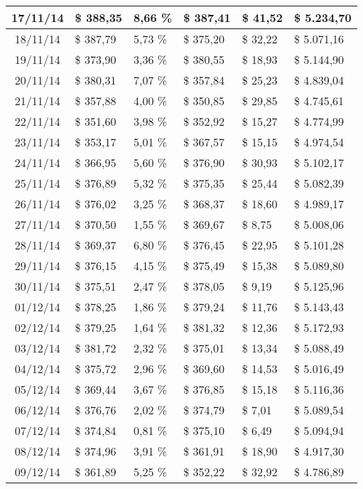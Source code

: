 \begin{small}
\begin{longtable}{|c|l|l|l|l|l|}
17/11/14 & \$ 388,35 & 8,66 \% & \$ 387,41 & \$ 41,52 & \$ 5.234,70 \\ \hline
18/11/14 & \$ 387,79 & 5,73 \% & \$ 375,20 & \$ 32,22 & \$ 5.071,16 \\ \hline
19/11/14 & \$ 373,90 & 3,36 \% & \$ 380,55 & \$ 18,93 & \$ 5.144,90 \\ \hline
20/11/14 & \$ 380,31 & 7,07 \% & \$ 357,84 & \$ 25,23 & \$ 4.839,04 \\ \hline
21/11/14 & \$ 357,88 & 4,00 \% & \$ 350,85 & \$ 29,85 & \$ 4.745,61 \\ \hline
22/11/14 & \$ 351,60 & 3,98 \% & \$ 352,92 & \$ 15,27 & \$ 4.774,99 \\ \hline
23/11/14 & \$ 353,17 & 5,01 \% & \$ 367,57 & \$ 15,15 & \$ 4.974,54 \\ \hline
24/11/14 & \$ 366,95 & 5,60 \% & \$ 376,90 & \$ 30,93 & \$ 5.102,17 \\ \hline
25/11/14 & \$ 376,89 & 5,32 \% & \$ 375,35 & \$ 25,44 & \$ 5.082,39 \\ \hline
26/11/14 & \$ 376,02 & 3,25 \% & \$ 368,37 & \$ 18,60 & \$ 4.989,17 \\ \hline
27/11/14 & \$ 370,50 & 1,55 \% & \$ 369,67 & \$ 8,75 & \$ 5.008,06 \\ \hline
28/11/14 & \$ 369,37 & 6,80 \% & \$ 376,45 & \$ 22,95 & \$ 5.101,28 \\ \hline
29/11/14 & \$ 376,15 & 4,15 \% & \$ 375,49 & \$ 15,38 & \$ 5.089,80 \\ \hline
30/11/14 & \$ 375,51 & 2,47 \% & \$ 378,05 & \$ 9,19 & \$ 5.125,96 \\ \hline
01/12/14 & \$ 378,25 & 1,86 \% & \$ 379,24 & \$ 11,76 & \$ 5.143,43 \\ \hline
02/12/14 & \$ 379,25 & 1,64 \% & \$ 381,32 & \$ 12,36 & \$ 5.172,93 \\ \hline
03/12/14 & \$ 381,72 & 2,32 \% & \$ 375,01 & \$ 13,34 & \$ 5.088,49 \\ \hline
04/12/14 & \$ 375,72 & 2,96 \% & \$ 369,60 & \$ 14,53 & \$ 5.016,49 \\ \hline
05/12/14 & \$ 369,44 & 3,67 \% & \$ 376,85 & \$ 15,18 & \$ 5.116,36 \\ \hline
06/12/14 & \$ 376,76 & 2,02 \% & \$ 374,79 & \$ 7,01 & \$ 5.089,54 \\ \hline
07/12/14 & \$ 374,84 & 0,81 \% & \$ 375,10 & \$ 6,49 & \$ 5.094,94 \\ \hline
08/12/14 & \$ 374,96 & 3,91 \% & \$ 361,91 & \$ 18,90 & \$ 4.917,30 \\ \hline
09/12/14 & \$ 361,89 & 5,25 \% & \$ 352,22 & \$ 32,92 & \$ 4.786,89 \\ \hline

\end{longtable}
\end{small}
